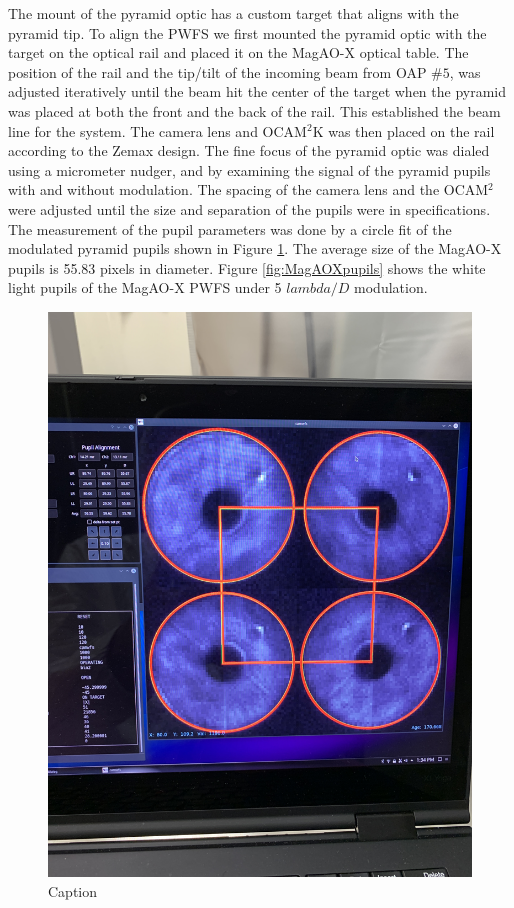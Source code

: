 The mount of the pyramid optic has a custom target that aligns with the pyramid tip. To align the PWFS we first mounted the pyramid optic with the target on the optical rail and placed it on the MagAO-X optical table. The position of the rail and the tip/tilt of the incoming beam from OAP $\#5$, was adjusted iteratively until the beam hit the center of the target when the pyramid was placed at both the front and the back of the rail. This established the beam line for the system. The camera lens and OCAM$^2$K was then placed on the rail according to the Zemax design. The fine focus of the pyramid optic was dialed using a micrometer nudger, and by examining the signal of the pyramid pupils with and without modulation. The spacing of the camera lens and the OCAM$^2$ were adjusted until the size and separation of the pupils were in specifications. The measurement of the pupil parameters was done by a circle fit of the modulated pyramid pupils shown in Figure \ref{fig:fitPupils}. The average size of the MagAO-X pupils is 55.83 pixels in diameter. Figure \ref{fig:MagAOXpupils} shows the white light pupils of the MagAO-X PWFS under 5 $lambda/D$ modulation.

\begin{figure}
    \centering
    \includegraphics[width=.8\textwidth]{Chapter Materials/Chapter Three Materials/Age 170.668.jpeg}
    \caption{Caption}
    \label{fig:fitPupils}
\end{figure}


